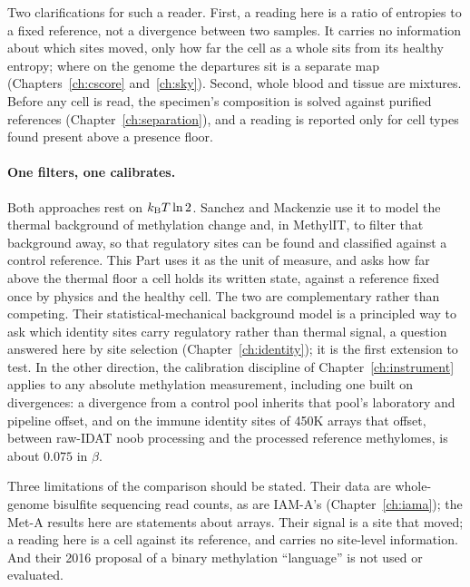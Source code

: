 Two clarifications for such a reader. First, a reading here is a ratio of entropies to a fixed reference, not a divergence between two samples.
It carries no information about which sites moved, only how far the cell as a whole sits from its healthy entropy; where on the genome the
departures sit is a separate map (Chapters~\ref{ch:cscore} and~\ref{ch:sky}). Second, whole blood and tissue are mixtures. Before any cell is
read, the specimen's composition is solved against purified references (Chapter~\ref{ch:separation}), and a reading is reported only for cell
types found present above a presence floor.

\paragraph{One filters, one calibrates.} Both approaches rest on $k_{\mathrm B} T\ln2$. Sanchez and Mackenzie use it to model the thermal background of
methylation change and, in MethylIT, to filter that background away, so that regulatory sites can be found and classified against a control
reference. This Part uses it as the unit of measure, and asks how far above the thermal floor a cell holds its written state, against a
reference fixed once by physics and the healthy cell. The two are complementary rather than competing. Their statistical-mechanical background
model is a principled way to ask which identity sites carry regulatory rather than thermal signal, a question answered here by site selection
(Chapter~\ref{ch:identity}); it is the first extension to test. \openprob{} In the other direction, the calibration discipline of
Chapter~\ref{ch:instrument} applies to any absolute methylation measurement, including one built on divergences: a
divergence from a control pool inherits that pool's laboratory and pipeline offset, and on the immune identity sites of 450K arrays that offset,
between raw-IDAT noob processing and the processed reference methylomes, is about $0.075$ in $\beta$. \measured

Three limitations of the comparison should be stated. Their data are whole-genome bisulfite sequencing read counts, as are IAM-A's (Chapter~\ref{ch:iama}); the Met-A results here are statements about arrays. Their signal is a site that moved; a reading here is a cell against its reference, and carries no site-level
information. And their 2016 proposal of a binary methylation ``language'' is not used or evaluated.

